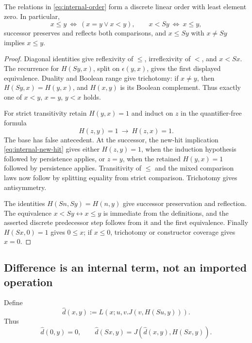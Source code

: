 \begin{lemma}
\label{lem:internal-linear-order}
The relations in \eqref{eq:internal-order} form a discrete linear order
with least element zero.  In particular,
\[
 x\le y\ \Longleftrightarrow\ (x=y\lor x<y),\qquad
 x<Sy\ \Longleftrightarrow\ x\le y,
\]
successor preserves and reflects both comparisons, and
$x\le Sy$ with $x\ne Sy$ implies $x\le y$.
\end{lemma}
\begin{proof}
Diagonal identities give reflexivity of $\le$, irreflexivity of $<$,
and $x<Sx$.  The recurrence for $H(Sy,x)$, split on $\epsilon(y,x)$,
gives the first displayed equivalence.  Duality and Boolean range give
trichotomy: if $x\ne y$, then $H(Sy,x)=H(y,x)$, and $H(x,y)$ is its
Boolean complement.  Thus exactly one of $x<y$, $x=y$, $y<x$ holds.

For strict transitivity retain $H(y,x)=1$ and induct on $z$ in the
quantifier-free formula
\[
                 H(z,y)=1\ \longrightarrow\ H(z,x)=1.
\]
The base has false antecedent.  At the successor, the new-hit implication
\eqref{eq:internal-new-hit} gives either $H(z,y)=1$, when the induction
hypothesis followed by persistence applies, or $z=y$, when the retained
$H(y,x)=1$ followed by persistence applies.  Transitivity of $\le$ and
the mixed comparison laws now follow by splitting equality from strict
comparison.  Trichotomy gives antisymmetry.

The identities $H(Sn,Sy)=H(n,y)$ give successor preservation and
reflection.  The equivalence $x<Sy\leftrightarrow x\le y$ is immediate
from the definitions, and the asserted discrete predecessor step follows
from it and the first equivalence.  Finally $H(Sx,0)=1$ gives $0\le x$;
if $x\le0$, trichotomy or constructor coverage gives $x=0$.
\end{proof}

\subsection{Difference is an internal term, not an imported operation}

Define
\[
 \widehat d(x,y):=L(x;u,v.J(v,H(Su,y))).
\]
Thus
\[
 \widehat d(0,y)=0,
 \qquad \widehat d(Sx,y)=J(\widehat d(x,y),H(Sx,y)).
 \tag{d}\label{eq:internal-difference-recursion}
\]


